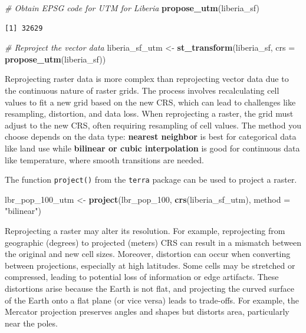 \documentclass[
  letterpaper,
]{krantz}
\newenvironment{Shaded}{\begin{snugshade}}{\end{snugshade}}
\newcommand{\AttributeTok}[1]{\textcolor[rgb]{0.13,0.29,0.53}{#1}}
\newcommand{\CommentTok}[1]{\textcolor[rgb]{0.56,0.35,0.01}{\textit{#1}}}
\newcommand{\FunctionTok}[1]{\textcolor[rgb]{0.13,0.29,0.53}{\textbf{#1}}}
\newcommand{\NormalTok}[1]{#1}
\newcommand{\OtherTok}[1]{\textcolor[rgb]{0.56,0.35,0.01}{#1}}
\newcommand{\StringTok}[1]{\textcolor[rgb]{0.31,0.60,0.02}{#1}}
\begin{document}
\begin{Shaded}
\begin{Highlighting}[]
\CommentTok{\# Obtain EPSG code for UTM for Liberia}
\FunctionTok{propose\_utm}\NormalTok{(liberia\_sf)}
\end{Highlighting}
\end{Shaded}

\begin{verbatim}
[1] 32629
\end{verbatim}

\begin{Shaded}
\begin{Highlighting}[]
\CommentTok{\# Reproject the vector data }
\NormalTok{liberia\_sf\_utm }\OtherTok{\textless{}{-}} \FunctionTok{st\_transform}\NormalTok{(liberia\_sf, }\AttributeTok{crs =} \FunctionTok{propose\_utm}\NormalTok{(liberia\_sf))}
\end{Highlighting}
\end{Shaded}

Reprojecting raster data is more complex than reprojecting vector data
due to the continuous nature of raster grids. The process involves
recalculating cell values to fit a new grid based on the new CRS, which
can lead to challenges like resampling, distortion, and data loss. When
reprojecting a raster, the grid must adjust to the new CRS, often
requiring resampling of cell values. The method you choose depends on
the data type: \textbf{nearest neighbor} is best for categorical data
like land use while \textbf{bilinear or cubic interpolation} is good for
continuous data like temperature, where smooth transitions are needed.

The function \texttt{project()} from the \texttt{terra} package can be
used to project a raster.

\begin{Shaded}
\begin{Highlighting}[]
\NormalTok{lbr\_pop\_100\_utm }\OtherTok{\textless{}{-}} \FunctionTok{project}\NormalTok{(lbr\_pop\_100, }
                           \FunctionTok{crs}\NormalTok{(liberia\_sf\_utm),}
                           \AttributeTok{method =} \StringTok{"bilinear"}\NormalTok{)}
\end{Highlighting}
\end{Shaded}

Reprojecting a raster may alter its resolution. For example,
reprojecting from geographic (degrees) to projected (meters) CRS can
result in a mismatch between the original and new cell sizes. Moreover,
distortion can occur when converting between projections, especially at
high latitudes. Some cells may be stretched or compressed, leading to
potential loss of information or edge artifacts. These distortions arise
because the Earth is not flat, and projecting the curved surface of the
Earth onto a flat plane (or vice versa) leads to trade-offs. For
example, the Mercator projection preserves angles and shapes but
distorts area, particularly near the poles.
\end{document}
